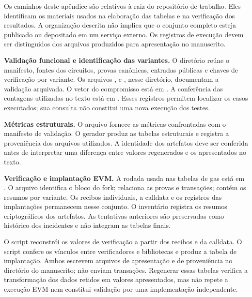\label{ap:rastreabilidade}
\begingroup
\sloppy

Os caminhos deste apêndice são relativos à raiz do repositório de trabalho. Eles identificam os materiais usados na elaboração das tabelas e na verificação dos resultados. A organização descrita não implica que o conjunto completo esteja publicado ou depositado em um serviço externo. Os registros de execução devem ser distinguidos dos arquivos produzidos para apresentação no manuscrito.

\textbf{Validação funcional e identificação das variantes.}
O diretório  reúne o manifesto, fontes dos circuitos, provas canônicas, entradas públicas e chaves de verificação por variante. Os arquivos ,  e , nesse diretório, documentam a validação arquivada. O vetor do compromisso está em . A conferência das contagens utilizadas no texto está em . Esses registros permitem localizar os casos executados; sua consulta não constitui uma nova execução dos testes.

\textbf{Métricas estruturais.}
O arquivo  fornece as métricas confrontadas com o manifesto de validação. O gerador  produz as tabelas estruturais e registra a proveniência dos arquivos utilizados. A identidade dos artefatos deve ser conferida antes de interpretar uma diferença entre valores regenerados e os apresentados no texto.

\textbf{Verificação e implantação EVM.}
A rodada usada nas tabelas de gas está em . O arquivo  identifica o bloco do fork;  relaciona as provas e transações;  contém os resumos por variante. Os recibos individuais, a calldata e os registros das implantações permanecem nesse conjunto. O inventário  registra os resumos criptográficos dos artefatos. As tentativas anteriores são preservadas como histórico dos incidentes e não integram as tabelas finais.

O script  reconstrói os valores de verificação a partir dos recibos e da calldata. O script  confere os vínculos entre verificadores e bibliotecas e produz a tabela de implantação. Ambos escrevem arquivos de apresentação e de proveniência no diretório do manuscrito; não enviam transações. Regenerar essas tabelas verifica a transformação dos dados retidos em valores apresentados, mas não repete a execução EVM nem constitui validação por uma implementação independente.

